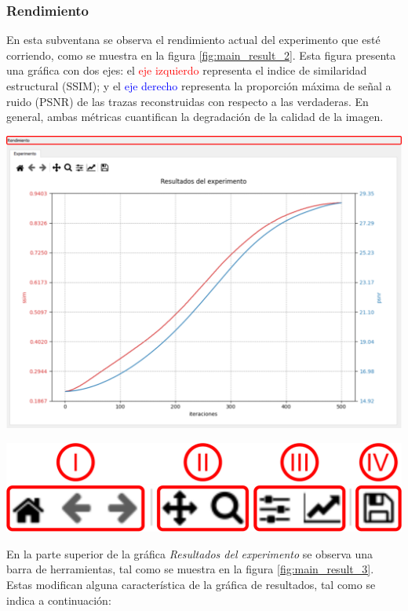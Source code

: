 \documentclass[12pt,twoside,letter]{ol-softwaremanual}
\newenvironment{Figure}
  {\par\medskip\noindent\minipage{\linewidth}}
  {\endminipage\par\medskip}
\begin{document}
\subsubsection*{Rendimiento}

En esta subventana se observa el rendimiento actual del experimento que esté corriendo, como se muestra en la figura \ref{fig:main_result_2}. Esta figura presenta una gráfica con dos ejes: el \textcolor{red}{eje izquierdo} representa el indice de similaridad estructural (SSIM); y el \textcolor{blue}{eje derecho} representa la proporción máxima de señal a ruido (PSNR) de las trazas reconstruidas con respecto a las verdaderas. En general, ambas métricas cuantifican la degradación de la calidad de la imagen.

\begin{Figure}
	\centering
	\includegraphics[width=0.8\linewidth]{main-result-2.png}
	\label{fig:main_result_2}
\end{Figure}

\begin{multicols}{2}

\begin{Figure}
	\vspace{0.7cm}
	\centering
	\includegraphics[width=0.9\linewidth]{main-result-3.png}
	\label{fig:main_result_3}
\end{Figure}

En la parte superior de la gráfica \textit{Resultados del experimento} se observa una barra de herramientas, tal como se muestra en la figura \ref{fig:main_result_3}. Estas modifican alguna característica de la gráfica de resultados, tal como se indica a continuación:

\end{multicols}
\end{document}
